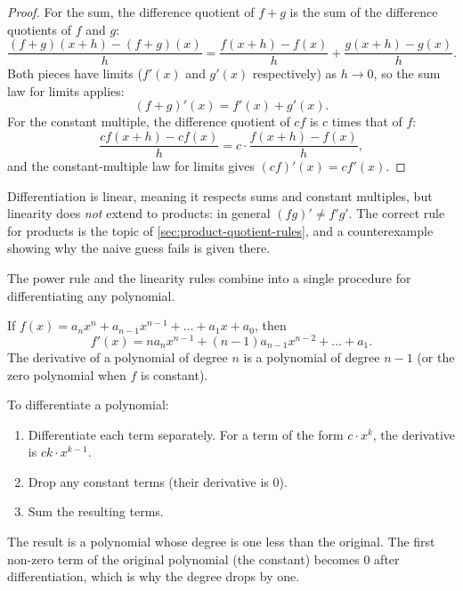 \begin{proof}
For the sum, the difference quotient of \(f + g\) is the sum of the difference quotients of \(f\) and \(g\):
\[
\frac{(f + g)(x + h) - (f + g)(x)}{h}
= \frac{f(x + h) - f(x)}{h} + \frac{g(x + h) - g(x)}{h}.
\]
Both pieces have limits (\(f'(x)\) and \(g'(x)\) respectively) as \(h \to 0\), so the sum law for limits applies:
\[
(f + g)'(x) = f'(x) + g'(x).
\]
For the constant multiple, the difference quotient of \(c f\) is \(c\) times that of \(f\):
\[
\frac{c f(x + h) - c f(x)}{h}
= c \cdot \frac{f(x + h) - f(x)}{h},
\]
and the constant-multiple law for limits gives \((c f)'(x) = c f'(x)\).
\end{proof}

\begin{caution}
Differentiation is linear, meaning it respects sums and constant multiples, but linearity does \emph{not} extend to products: in general \((f g)' \neq f' g'\). The correct rule for products is the topic of \cref{sec:product-quotient-rules}, and a counterexample showing why the naive guess fails is given there.
\end{caution}

The power rule and the linearity rules combine into a single procedure for differentiating any polynomial.

\begin{corollary}\label{cor:polynomial-derivative}
If \(f(x) = a_{n} x^{n} + a_{n - 1} x^{n - 1} + \dots + a_{1} x + a_{0}\), then
\[
f'(x) = n a_{n} x^{n - 1} + (n - 1) a_{n - 1} x^{n - 2} + \dots + a_{1}.
\]
The derivative of a polynomial of degree \(n\) is a polynomial of degree \(n - 1\) (or the zero polynomial when \(f\) is constant).
\end{corollary}

\begin{strategy}
To differentiate a polynomial:
\begin{enumerate}
    \item Differentiate each term separately. For a term of the form \(c \cdot x^{k}\), the derivative is \(c k \cdot x^{k - 1}\).
    \item Drop any constant terms (their derivative is \(0\)).
    \item Sum the resulting terms.
\end{enumerate}
The result is a polynomial whose degree is one less than the original. The first non-zero term of the original polynomial (the constant) becomes \(0\) after differentiation, which is why the degree drops by one.
\end{strategy}


